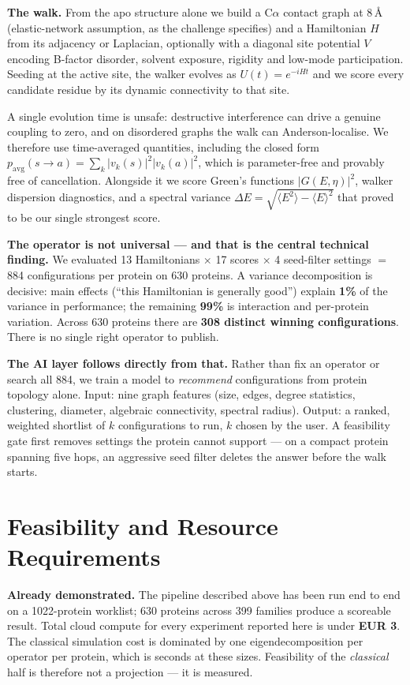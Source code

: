 \documentclass[10pt,a4paper]{article}
\newcommand{\num}[1]{\textbf{#1}}
\begin{document}
\textbf{The walk.} From the apo structure alone we build a C$\alpha$ contact graph at 8\,\AA{}
(elastic-network assumption, as the challenge specifies) and a Hamiltonian $H$ from its adjacency
or Laplacian, optionally with a diagonal site potential $V$ encoding B-factor disorder, solvent
exposure, rigidity and low-mode participation. Seeding at the active site, the walker evolves as
$U(t)=e^{-iHt}$ and we score every candidate residue by its dynamic connectivity to that site.

A single evolution time is unsafe: destructive interference can drive a genuine coupling to zero,
and on disordered graphs the walk can Anderson-localise. We therefore use time-averaged
quantities, including the closed form
$p_{\mathrm{avg}}(s\!\to\!a)=\sum_k |v_k(s)|^2|v_k(a)|^2$,
which is parameter-free and provably free of cancellation. Alongside it we score Green's functions
$|G(E,\eta)|^2$, walker dispersion diagnostics, and a spectral variance
$\Delta E=\sqrt{\langle E^2\rangle-\langle E\rangle^2}$ that proved to be our single strongest
score.

\textbf{The operator is not universal --- and that is the central technical finding.} We evaluated
13 Hamiltonians $\times$ 17 scores $\times$ 4 seed-filter settings $=$ 884 configurations per
protein on 630 proteins. A variance decomposition is decisive: main effects (``this Hamiltonian is
generally good'') explain \num{1\%} of the variance in performance; the remaining \num{99\%} is
interaction and per-protein variation. Across 630 proteins there are \num{308 distinct winning
configurations}. There is no single right operator to publish.

\textbf{The AI layer follows directly from that.} Rather than fix an operator or search all 884,
we train a model to \emph{recommend} configurations from protein topology alone. Input: nine graph
features (size, edges, degree statistics, clustering, diameter, algebraic connectivity, spectral
radius). Output: a ranked, weighted shortlist of $k$ configurations to run, $k$ chosen by the user.
A feasibility gate first removes settings the protein cannot support --- on a compact protein
spanning five hops, an aggressive seed filter deletes the answer before the walk starts.

\section{Feasibility and Resource Requirements}

\textbf{Already demonstrated.} The pipeline described above has been run end to end on a
1022-protein worklist; 630 proteins across 399 families produce a scoreable result. Total cloud
compute for every experiment reported here is under \num{EUR 3}. The classical simulation cost
is dominated by one eigendecomposition per operator per protein, which is seconds at these sizes.
Feasibility of the \emph{classical} half is therefore not a projection --- it is measured.
\end{document}
